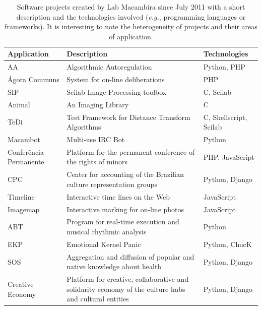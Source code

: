 \documentclass{article}
\newcommand{\eg}{{\it e.g.}}
\begin{document}
\begin{table}
    \caption{Software projects created by Lab Macambira since July
      2011 with a short description and the technologies involved (\eg,
      programming languages or frameworks). It is
      interesting to note the heterogeneity of projects and their areas
      of application.}
    \footnotesize{\begin{tabular}{|l|p{5cm}|l|}
        \hline
        Application & Description & Technologies \\ 
        \hline \hline
        AA            & Algorithmic Autoregulation      & Python, PHP \\
        \hline
        \'{A}gora Communs & System for on-line deliberations & PHP \\
        \hline
        SIP           & Scilab Image Processing toolbox & C, Scilab \\
        \hline
        Animal        & An Imaging Library              & C \\
        \hline
        TeDi          & Test Framework for Distance Transform
        Algorithms & C, Shellscript, Scilab \\
        \hline
        Macambot      & Multi-use IRC Bot               & Python \\
        \hline
        Confer\^{e}ncia Permanente & Platform for the permanent
        conference of the rights of minors & PHP, JavaScript \\
        \hline
        CPC           & Center for accounting of the Brazilian culture
        representation groups & Python, Django \\
        \hline
        Timeline      & Interactive time lines on the Web & JavaScript
        \\
        \hline
        Imagemap      & Interactive marking for on-line photos &
        JavaScript \\
        \hline
        ABT           & Program for real-time execution and musical
        rhythmic analysis & Python \\
        \hline
        EKP           & Emotional Kernel Panic & Python, ChucK \\
        \hline
        SOS           & Aggregation and diffusion of popular and native
        knowledge about health & Python, Django \\
        \hline
        Creative Economy & Platform for creative, collaborative and
        solidarity economy of the culture hubs and cultural entities &
        Python, Django \\

\end{tabular}}
\end{table}
\end{document}
